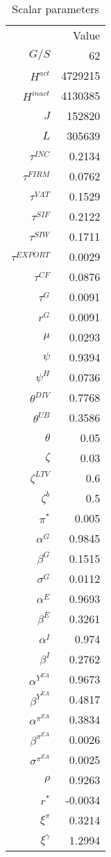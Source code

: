 \begin{table}
\centering
\begin{tabular}{rr}
 & Value \\
$G/S$ & 62 \\
$H^{act}$ & 4729215 \\
$H^{inact}$ & 4130385 \\
$J$ & 152820 \\
$L$ & 305639 \\
$\tau^{INC}$ & 0.2134 \\
$\tau^{FIRM}$ & 0.0762 \\
$\tau^{VAT}$ & 0.1529 \\
$\tau^{SIF}$ & 0.2122 \\
$\tau^{SIW}$ & 0.1711 \\
$\tau^{EXPORT}$ & 0.0029 \\
$\tau^{CF}$ & 0.0876 \\
$\tau^{G}$ & 0.0091 \\
$r^{G}$ & 0.0091 \\
$\mu$ & 0.0293 \\
$\psi$ & 0.9394 \\
$\psi^{H}$ & 0.0736 \\
$\theta^{DIV}$ & 0.7768 \\
$\theta^{UB}$ & 0.3586 \\
$\theta$ & 0.05 \\
$\zeta$ & 0.03 \\
$\zeta^{LTV}$ & 0.6 \\
$\zeta^b$ & 0.5 \\
$\pi^{*}$ & 0.005 \\
$\alpha^{G}$ & 0.9845 \\
$\beta^{G}$ & 0.1515 \\
$\sigma^{G}$ & 0.0112 \\
$\alpha^{E}$ & 0.9693 \\
$\beta^{E}$ & 0.3261 \\
$\alpha^{I}$ & 0.974 \\
$\beta^{I}$ & 0.2762 \\
$\alpha^{Y^{EA}}$ & 0.9673 \\
$\beta^{Y^{EA}}$ & 0.4817 \\
$\alpha^{\pi^{EA}}$ & 0.3834 \\
$\beta^{\pi^{EA}}$ & 0.0026 \\
$\sigma^{\pi^{EA}}$ & 0.0025 \\
$\rho$ & 0.9263 \\
$r^{*}$ & -0.0034 \\
$\xi^{\pi}$ & 0.3214 \\
$\xi^{\gamma}$ & 1.2994 \\
\end{tabular}
\caption{Scalar parameters}
\label{table:scalar_parameters}
\end{table}

